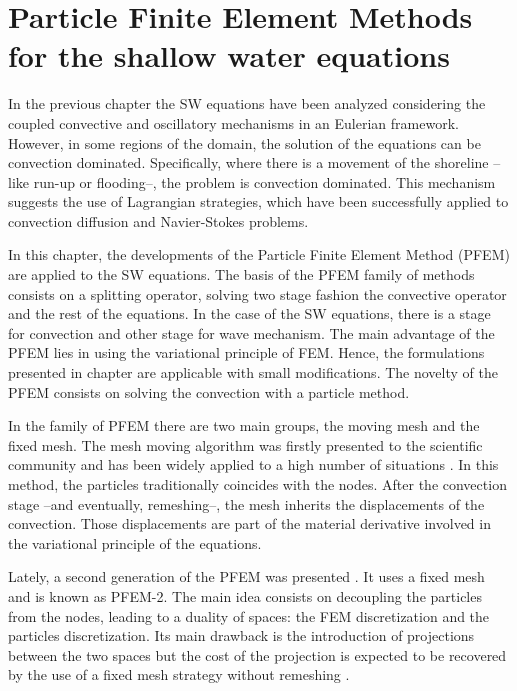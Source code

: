 
\chapter{Particle Finite Element Methods for the shallow water equations}
\label{lagrangian_sw}




In the previous chapter the SW equations have been analyzed considering the coupled convective and oscillatory mechanisms in an Eulerian framework. However, in some regions of the domain, the solution of the equations can be convection dominated. Specifically, where there is a movement of the shoreline --like run-up or flooding--, the problem is convection dominated.
This mechanism suggests the use of Lagrangian strategies, which have been successfully applied to convection diffusion and Navier-Stokes problems.

In this chapter, the developments of the Particle Finite Element Method (PFEM) are applied to the SW equations. The basis of the PFEM family of methods consists on a splitting operator, solving two stage fashion the convective operator and the rest of the equations. In the case of the SW equations, there is a stage for convection and other stage for wave mechanism.
The main advantage of the PFEM lies in using the variational principle of FEM. Hence, the formulations presented in chapter  are applicable with small modifications. The novelty of the PFEM consists on solving the convection with a particle method.

In the family of PFEM there are two main groups, the moving mesh and the fixed mesh. The mesh moving algorithm was firstly presented to the scientific community \cite{idelsohn2003,PFEM2004} and has been widely applied to a high number of situations \cite{larese2008,Salazar2012,onate2008}. In this method, the particles traditionally coincides with the nodes. After the convection stage --and eventually, remeshing--, the mesh inherits the displacements of the convection. Those displacements are part of the material derivative involved in the variational principle of the equations.

Lately, a second generation of the PFEM was presented \cite{idelsohn2012}. It uses a fixed mesh and is known as PFEM-2. The main idea consists on decoupling the particles from the nodes, leading to a duality of spaces: the FEM discretization and the particles discretization. Its main drawback is the introduction of projections between the two spaces but the cost of the projection is expected to be recovered by the use of a fixed mesh strategy without remeshing \cite{idelsohn2015,puigferrat2021}.



